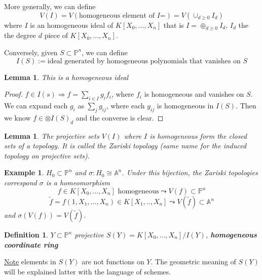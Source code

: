 \documentclass[11pt]{article}
\newtheorem{lemma}[thm]{Lemma}
\newtheorem{dfn}[thm]{Definition}
\newtheorem{ex}[thm]{Example}
\newcommand{\affn}{\mathbb A}
\newcommand{\proj}{\mathbb P}
\newcommand{\Lrta}{\Longrightarrow}
\begin{document}
	More generally, we can define 
	$$
	V(I)=V(\text{homogeneous element of $I$=})=V(\cup_{d\geq 0} I_d)
	$$
	where $I$ is an homogeneous ideal of $K[X_0,...,X_n]$ that is  $I=\oplus_{d\geq 0} I_d$, $I_d$ the the degree $d$ piece of $K[X_0,...,X_n]$.
	
	Conversely, given $S\subset \proj^n$, we can define 
	$$
	I(S):=\text{ideal generated by homogeneous polynomials that vanishes on $S$}
	$$
	\begin{lemma}
		This is a homogeneous ideal
	\end{lemma}
	\begin{proof}
		$f\in I(s)\Lrta f=\sum_{i\in I}g_i f_i$, where $f_i$ is homogeneous and vanishes on $S$. We can expand each $g_i$ as $\sum_j g_{ij}$, where each $g_{ij}$ is homogeneous in $I(S)$. Then we know $f\in \otimes I(S)_d$ and the converse is clear.
	\end{proof}
	\begin{lemma}
		The projective sets $V(I)$ where $I$ is homogeneous form the closed sets of a topology. It is called the Zariski topology (same name for the induced topology on projective sets).
	\end{lemma}
	\begin{ex}
		$H_0\subset \proj^n$ and $\sigma: H_0\cong \affn^n$. Under this bijection, the Zariski topologies correspond $\sigma $ is a homeomorphism
		$$
		f\in K[X_0,...,X_n]\text{ homogeneous} \leadsto V(f)\subset \proj^n
		$$
		$$
		\tilde{f}=f(1,X_1,...,X_n)\in K[X_1,..,X_n]\leadsto V(\tilde{f})\subset \affn^n
		$$
		and $\sigma(V(f))=V(\tilde{f})$.
	\end{ex}
	\begin{dfn}
		$Y\subset \proj^n$ projective $S(Y)=K[X_0,...,X_n]/I(Y)$, \textbf{homogeneous coordinate ring}
	\end{dfn}
	\underline{Note} elements in $S(Y)$ are not functions on $Y$. The geometric meaning of $S(Y)$ will be explained latter with the language of schemes.
	
\end{document}
